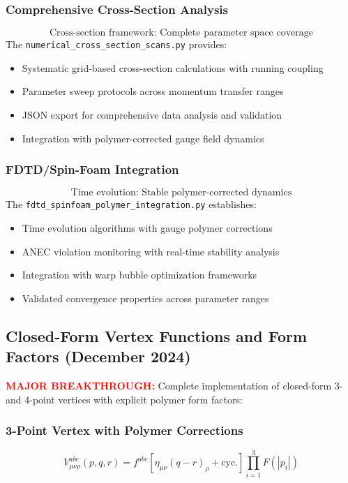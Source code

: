 \documentclass[11pt]{article}
\begin{document}
\subsubsection*{Comprehensive Cross-Section Analysis}
\[
  \boxed{\text{Cross-section framework: Complete parameter space coverage}}
\]
The \texttt{numerical\_cross\_section\_scans.py} provides:
\begin{itemize}
  \item Systematic grid-based cross-section calculations with running coupling
  \item Parameter sweep protocols across momentum transfer ranges
  \item JSON export for comprehensive data analysis and validation
  \item Integration with polymer-corrected gauge field dynamics
\end{itemize}

\subsubsection*{FDTD/Spin-Foam Integration}
\[
  \boxed{\text{Time evolution: Stable polymer-corrected dynamics}}
\]
The \texttt{fdtd\_spinfoam\_polymer\_integration.py} establishes:
\begin{itemize}
  \item Time evolution algorithms with gauge polymer corrections
  \item ANEC violation monitoring with real-time stability analysis
  \item Integration with warp bubble optimization frameworks
  \item Validated convergence properties across parameter ranges
\end{itemize}

\subsection*{Closed-Form Vertex Functions and Form Factors (December 2024)}

\textcolor{red}{\textbf{MAJOR BREAKTHROUGH:}} Complete implementation of closed-form 3- and 4-point vertices with explicit polymer form factors:

\subsubsection*{3-Point Vertex with Polymer Corrections}
\[
  \boxed{V^{abc}_{\mu\nu\rho}(p,q,r) = f^{abc} \left[\eta_{\mu\nu}(q-r)_\rho + \text{cyc.}\right] \prod_{i=1}^3 F(|p_i|)}
\]
\end{document}
